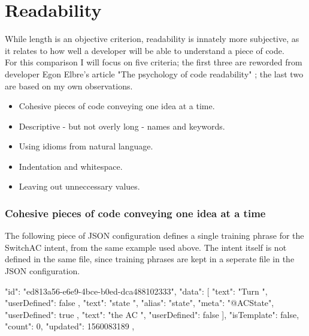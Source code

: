 \section{Readability}

While length is an objective criterion, readability is innately more subjective, as it relates to how well a developer will be able to understand a piece of code.\\
For this comparison I will focus on five criteria; the first three are reworded from developer Egon Elbre's article "The psychology of code readability" \cite{Elbre}; the last two are based on my own observations.
\begin{itemize}
    \item Cohesive pieces of code conveying one idea at a time.
    \item Descriptive - but not overly long - names and keywords.
    \item Using idioms from natural language.
    \item Indentation and whitespace.
    \item Leaving out unneccessary values.
\end{itemize}

\subsubsection{Cohesive pieces of code conveying one idea at a time}

The following piece of JSON configuration defines a single training phrase for the SwitchAC intent, from the same example used above. The intent itself is not defined in the same file, since training phrases are kept in a seperate file in the JSON configuration.
\begin{samepage}
    \begin{JSON}
        {
            "id": "ed813a56-e6e9-4bce-b0ed-dca488102333",
            "data": [
              {
                "text": "Turn ",
                "userDefined": false
              },
              {
                "text": "state ",
                "alias": "state",
                "meta": "@ACState",
                "userDefined": true
              },
              {
                "text": "the AC ",
                "userDefined": false
              }
            ],
            "isTemplate": false,
            "count": 0,
            "updated": 1560083189
          },
    \end{JSON}
\end{samepage}

